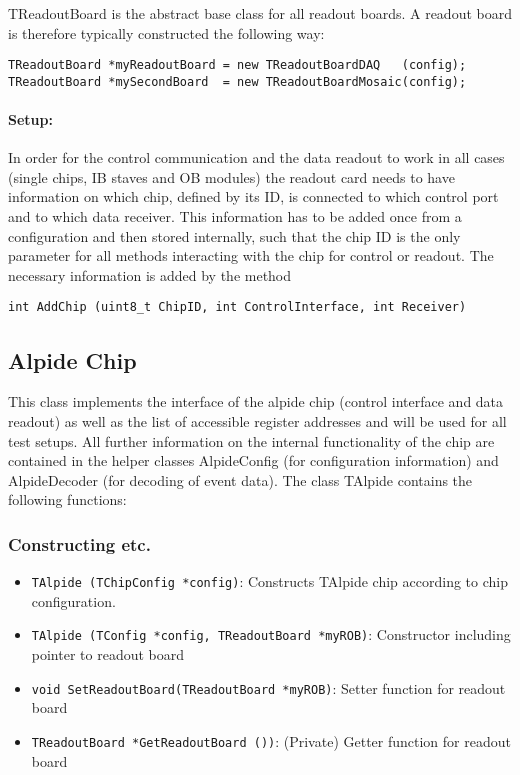 \documentclass{article}
\begin{document}
TReadoutBoard is the abstract base class for all readout boards. A
readout board is therefore typically constructed the following way: 

\begin{lstlisting}
TReadoutBoard *myReadoutBoard = new TReadoutBoardDAQ   (config);
TReadoutBoard *mySecondBoard  = new TReadoutBoardMosaic(config);
\end{lstlisting}

\paragraph {Setup:}
In order for the control communication and the data readout to work in
all cases (single chips, IB staves and OB modules) the readout card
needs to have information on which chip, defined by its ID, is
connected to which control port and to which data receiver. This
information has to be added once from a configuration and then stored
internally, such that the chip ID is the only parameter for all
methods interacting with the chip for control or readout. The
necessary information is added by the method 

\begin{lstlisting}
int AddChip (uint8_t ChipID, int ControlInterface, int Receiver)
\end{lstlisting}



\subsection {Alpide Chip}
This class implements the interface of the alpide chip (control
interface and data readout) as well as the list of accessible register
addresses and will be used for all test setups. All further
information on the internal functionality of the chip are contained in
the helper classes AlpideConfig (for configuration information) and
AlpideDecoder (for decoding of event data). The class TAlpide
contains the following functions: 


\subsubsection {Constructing etc.}

\begin{itemize}
\item \texttt{TAlpide (TChipConfig *config)}: \newline
  Constructs TAlpide chip according to chip configuration.
\item \texttt{TAlpide (TConfig *config, TReadoutBoard *myROB)}: \newline Constructor
  including pointer to readout board
\item \texttt{void SetReadoutBoard(TReadoutBoard *myROB)}: \newline
  Setter function for readout board
\item \texttt{TReadoutBoard *GetReadoutBoard ())}: \newline (Private)
  Getter function for readout board
\end{itemize}
\end{document}
